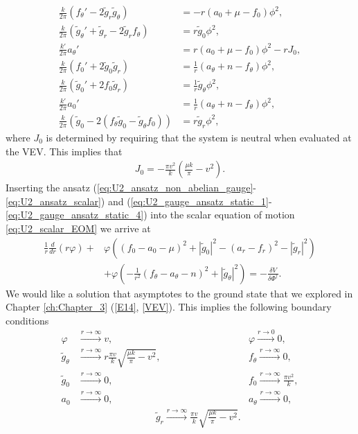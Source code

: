     \begin{align}
        \frac{k}{2 \pi } \left(f_{\theta}' - 2\tilde{g}_r \tilde{g}_{\theta}\right) &= -r \left(a_0 + \mu - f_0\right) \phi^2,\\
        \frac{k}{2 \pi} \left(\tilde{g}_{\theta}' + \tilde{g}_r - 2 \tilde{g}_r f_{\theta} \right) & = r\tilde{g}_0 \phi^2, \\
        \frac{k'}{2 \pi} a_{\theta}' &= r \left(a_0 +\mu - f_0 \right)\phi^2 - rJ_0, \\
        \frac{k}{2\pi} \left(f_0'+2 \tilde{g}_0\tilde{g}_r\right) &= \frac{1}{r} \left(a_{\theta}+n - f_{\theta}\right)\phi^2, \\
        \frac{k}{2\pi}\left(\tilde{g}_0' + 2 f_0 \tilde{g}_r \right) &=\frac{1}{r} \tilde{g}_{\theta}\phi^2, \\
        \frac{k'}{2\pi} a_0'&= \frac{1}{r} \left(a_{\theta}+n - f_{\theta}\right) \phi^2, \\
        \frac{k}{2\pi} \left(\tilde{g}_0 - 2\left(f_{\theta} \tilde{g}_0 - \tilde{g}_{\theta} f_0\right)\right) &= r \tilde{g}_r \phi^2,
    \end{align}
    where $J_0$ is determined by requiring that the system is neutral when evaluated at the VEV. This implies that
    \begin{align}
        J_0 = -\frac{\pi v^2}{k} \left(\frac{\mu k}{\pi}- v^2 \right).
    \end{align}
Inserting the ansatz (\ref{eq:U2_ansatz_non_abelian_gauge}-\ref{eq:U2_ansatz_scalar}) and (\ref{eq:U2_gauge_ansatz_static_1}-\ref{eq:U2_gauge_ansatz_static_4}) into the scalar equation of motion \ref{eq:U2_scalar_EOM} we arrive at
\begin{align}
    \frac{1}{r} \frac{d}{dr} \left(r \varphi\right)+ &\varphi \left( \left(f_0 -a_0 -\mu\right)^2 + |\tilde{g}_0|^2 - \left(a_r -f_r\right)^2 - |\tilde{g}_r|^2 \right)\nonumber \\
    &+ \varphi \left(-\frac{1}{r^2} \left(f_{\theta} - a_{\theta} -n\right)^2 +|\tilde{g}_{\theta}|^2 \right) = - \frac{\delta V}{\delta \Phi^{\dag}}.
\end{align}
We would like a solution that asymptotes to the ground state that we explored in Chapter \ref{ch:Chapter_3} (\ref{E14}, \ref{VEV}). This implies the following boundary conditions
\begin{align}
    \varphi &\xrightarrow{r \rightarrow \infty} v, \qquad \qquad \qquad & \varphi \xrightarrow{r \rightarrow 0} 0,\\
    \tilde{g}_{\theta} &\xrightarrow{r \rightarrow \infty} r \frac{\pi v}{k} \sqrt{ \frac{\mu k}{\pi} -v^2}, &f_{\theta} \xrightarrow{r \rightarrow \infty}0,\\ 
    \tilde{g}_0 &\xrightarrow{r \rightarrow \infty} 0, &f_0  \xrightarrow{r \rightarrow \infty}\frac{\pi v^2}{k},\\
     a_0 &\xrightarrow{r \rightarrow \infty} 0, &a_{\theta} \xrightarrow{r \rightarrow \infty} 0,\\
    & \qquad\qquad\qquad\qquad  \tilde{g}_r \xrightarrow{r \rightarrow \infty} \frac{\pi v}{k} \sqrt{ \frac{\mu k}{\pi} -v^2}.  & 
\end{align}




